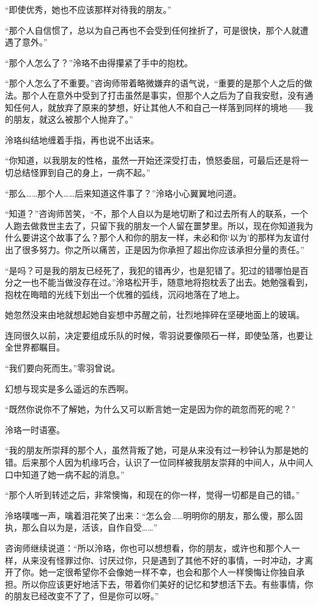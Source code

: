 \documentclass[UTF8, scheme = chinese, openany]{ctexbook}
\begin{document}
“即使优秀，她也不应该那样对待我的朋友。”

“那个人自信惯了，总以为自己再也不会受到任何挫折了，可是很快，那个人就遭遇了意外。”

“那个人怎么了？”泠珞不由得攥紧了手中的抱枕。

“那个人怎么了不重要。”咨询师带着略微嫌弃的语气说，“重要的是那个人之后的做法。那个人在意外中受到了打击虽然是事实，但那个人之后为了自我安慰，没有通知任何人，就放弃了原来的梦想，好让其他人不和自己一样落到同样的境地——我的朋友，就这么被那个人抛弃了。”

泠珞纠结地缠着手指，再也说不出话来。

“你知道，以我朋友的性格，虽然一开始还深受打击，愤怒委屈，可最后还是将一切总结怪罪到自己的身上，一病不起。”

“那么……那个人……后来知道这件事了？”泠珞小心翼翼地问道。

“知道？”咨询师苦笑，“不，那个人自以为是地切断了和过去所有人的联系，一个人跑去做救世主去了，只留下我的朋友一个人留在噩梦里。所以，现在你知道我为什么要讲这个故事了么？那个人和你的朋友一样，未必和你‘以为’的那样为友谊付出了很多努力。你之所以痛苦，正是因为你承担了超出你应该承担分量的责任。”

“是吗？可是我的朋友已经死了，我犯的错再少，也是犯错了。犯过的错哪怕是百分之一也不能当做没存在过。”泠珞松开手，随意地将抱枕丢了出去。她勉强看到，抱枕在晦暗的光线下划出一个优雅的弧线，沉闷地落在了地上。

她忽然没来由地就想起她自妄想中苏醒之前，壮烈地摔碎在坚硬地面上的玻璃。

连同很久以前，决定要组成乐队的时候，零羽说要像陨石一样，即使坠落，也要让全世界都瞩目。

“我们要向死而生。”零羽曾说。

幻想与现实是多么遥远的东西啊。

“既然你说你不了解她，为什么又可以断言她一定是因为你的疏忽而死的呢？”

泠珞一时语塞。

“我的朋友所崇拜的那个人，虽然背叛了她，可是从来没有过一秒钟认为那是她的错。后来那个人因为机缘巧合，认识了一位同样被我朋友崇拜的中间人，从中间人口中知道了她一病不起的消息。”

“那个人听到转述之后，非常懊悔，和现在的你一样，觉得一切都是自己的错。”

泠珞噗嗤一声，噙着泪花笑了出来：“怎么会……明明你的朋友，那么傻，那么固执，那么自以为是，活该，自作自受……”

咨询师继续说道：“所以泠珞，你也可以想想看，你的朋友，或许也和那个人一样，从来没有怪罪过你、讨厌过你，只是遇到了其他不好的事情，一时冲动，才离开了你。她一定很希望你不会像她一样不幸，也会和那个人一样懊悔让你独自承担。所以你应该更好地活下去，带着你们美好的记忆和梦想活下去。有些事情，你的朋友已经改变不了了，但是你可以呀。”
\end{document}
